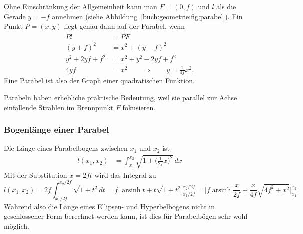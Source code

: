 Ohne Einschränkung der Allgemeinheit kann man $F=(0,f)$ und
$l$ als die Gerade $y=-f$ annehmen
(siehe Abbildung~\ref{buch:geometrie:fig:parabel}).
Ein Punkt $P=(x,y)$ liegt genau dann auf der Parabel, wenn
\begin{align*}
\overline{Pl}
&=
\overline{PF}
\\
(y+f)^2
&=
x^2 + (y-f)^2
\\
y^2+2yf+f^2
&=
x^2 + y^2-2yf+f^2
\\
4yf
&=
x^2
\qquad\Rightarrow\qquad y=\frac{1}{4f}x^2.
\end{align*}
Eine Parabel ist also der Graph einer quadratischen Funktion.

Parabeln haben erhebliche praktische Bedeutung, weil sie parallel zur
Achse einfallende Strahlen im Brennpunkt $F$ fokusieren.

%
%
\subsubsection{Bogenlänge einer Parabel}
Die Länge eines Parabelbogens zwischen $x_1$ und $x_2$ ist
\begin{align*}
l(x_1,x_2)
&=
\int_{x_1}^{x_2}
\sqrt{1+\biggl(\frac{1}{2f}x\biggr)^2}
\,dx
\end{align*}
Mit der Substitution $x=2ft$ wird das Integral zu
\[
l(x_1,x_2)
=
2f
\int_{x_1/2f}^{x_2/2f}
\sqrt{1+t^2}
\,dt
=
f\biggl[
\operatorname{arsinh} t +t\sqrt{1+t^2}
\biggr]_{x_1/2f}^{x_2/2f}
=
\biggl[
f
\operatorname{arsinh}\frac{x}{2f}
+
\frac{x}{4f}\sqrt{4f^2+x^2}
\biggr]_{x_1}^{x_2}.
\]
Während also die Länge eines Ellipsen- und Hyperbelbogens nicht in geschlossener
Form berechnet werden kann, ist dies für Parabelbögen sehr wohl
möglich.




